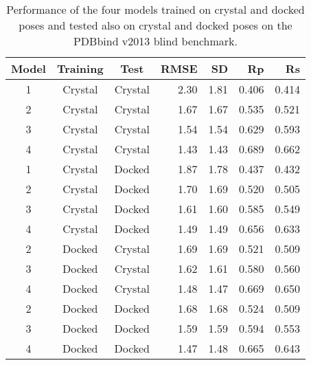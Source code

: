 \documentclass[twocolumn]{bmcart}
\begin{document}
\begin{backmatter}
\begin{table}[ht]
\caption{Performance of the four models trained on crystal and docked poses and tested also on crystal and docked poses on the PDBbind v2013 blind benchmark.}
\label{rescoring2:set-2-pdbbind-2012-raw}
\begin{tabular}{cccrrrr}
\hline
Model & Training & Test & RMSE & SD & Rp & Rs\\
\hline
1 & Crystal & Crystal & 2.30 & 1.81 & 0.406 & 0.414\\
2 & Crystal & Crystal & 1.67 & 1.67 & 0.535 & 0.521\\
3 & Crystal & Crystal & 1.54 & 1.54 & 0.629 & 0.593\\
4 & Crystal & Crystal & 1.43 & 1.43 & 0.689 & 0.662\\
\hline
1 & Crystal & Docked  & 1.87 & 1.78 & 0.437 & 0.432\\
2 & Crystal & Docked  & 1.70 & 1.69 & 0.520 & 0.505\\
3 & Crystal & Docked  & 1.61 & 1.60 & 0.585 & 0.549\\
4 & Crystal & Docked  & 1.49 & 1.49 & 0.656 & 0.633\\
\hline
2 & Docked  & Crystal & 1.69 & 1.69 & 0.521 & 0.509\\
3 & Docked  & Crystal & 1.62 & 1.61 & 0.580 & 0.560\\
4 & Docked  & Crystal & 1.48 & 1.47 & 0.669 & 0.650\\
\hline
2 & Docked  & Docked  & 1.68 & 1.68 & 0.524 & 0.509\\
3 & Docked  & Docked  & 1.59 & 1.59 & 0.594 & 0.553\\
4 & Docked  & Docked  & 1.47 & 1.48 & 0.665 & 0.643\\
\hline
\end{tabular}
\end{table}


\end{backmatter}
\end{document}
